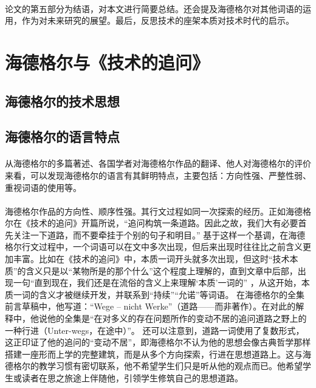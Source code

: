 \documentclass{article}
\begin{document}
        \paragraph{}
        论文的第五部分为结语，对本文进行简要总结。还会提及海德格尔对其他词语的运用，作为对未来研究的展望。最后，反思技术的座架本质对技术时代的启示。
\section{海德格尔与《技术的追问》} 
	\subsection{海德格尔的技术思想}
		\paragraph{}
	\subsection{海德格尔的语言特点}
		\paragraph{}
		从海德格尔的多篇著述、各国学者对海德格尔作品的翻译、他人对海德格尔的评价来看，可以发现海德格尔的语言有其鲜明特点，主要包括：方向性强、严整性弱、重视词语的使用等。
		\paragraph{}
		海德格尔作品的方向性、顺序性强。其行文过程如同一次探索的经历。正如海德格尔在《技术的追问》开篇所说，“追问构筑一条道路。因此之故，我们大有必要首先关注一下道路，而不要牵挂于个别的句子和明目。”
\cite{slct_Hei_Szx}
基于这样一个基调，在海德格尔行文过程中，一个词语可以在文中多次出现，但后来出现时往往比之前含义更加丰富。比如在《技术的追问》中，本质一词开头就多次出现，但这时“技术本质”的含义只是以“某物所是的那个什么”这个程度上理解的，直到文章中后部，出现一句“直到现在，我们还是在流俗的含义上来理解‘本质’一词的”
\cite{slct_Hei_Szx}
，从这开始，本质一词的含义才被继续开发，并联系到“持续”“允诺”等词语。
在海德格尔的全集前言草稿中，他写道：“Wege – nicht Werke”（道路——而非著作）。在对此的解释中，他说他的全集是“在对多义的存在问题所作的变动不居的追问道路之野上的一种行进（Unter-wegs，在途中）”。
\cite{sprach_sein_Szx}
还可以注意到，道路一词使用了复数形式，这正印证了他的追问的“变动不居”，即海德格尔不认为他的思想会像古典哲学那样搭建一座形而上学的完整建筑，而是从多个方向探索，行进在思想道路上。这与海德格尔的教学习惯有密切联系，他不希望学生们只是听从他的观点而已。他希望学生或读者在思之旅途上伴随他，引领学生修筑自己的思想道路。
\end{document}
